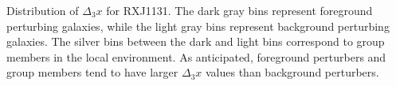 \label{fig:d3xhist} Distribution of $\Delta_3 x$ for RXJ1131. The dark gray bins represent foreground perturbing galaxies, while the light gray bins represent background perturbing galaxies. The silver bins between the dark and light bins correspond to group members in the local environment. As anticipated, foreground perturbers and group members tend to have larger $\Delta_3 x$ values than background perturbers. 